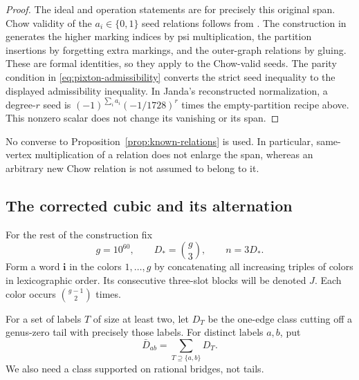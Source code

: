 \begin{proof}
The ideal and operation statements are
\cite[Proposition~1]{Pixton} for precisely this original span.
Chow validity of the \(a_i\in\{0,1\}\) seed relations follows from
\cite[Theorem~1 and its reconstruction]{Janda}.
The construction in \cite[Section~3.5]{PPZ} generates the higher
marking indices by psi multiplication, the partition insertions by
forgetting extra markings, and the outer-graph relations by gluing.
These are formal identities, so they apply to the Chow-valid seeds.
The parity condition in \eqref{eq:pixton-admissibility} converts the
strict seed inequality to the displayed admissibility inequality.
In Janda's reconstructed normalization, a degree-\(r\) seed is
\((-1)^{\sum_i a_i}(-1/1728)^r\) times the empty-partition recipe
above. This nonzero scalar does not change its vanishing or its span.
\end{proof}

No converse to Proposition~\ref{prop:known-relations} is used.
In particular, same-vertex multiplication of a relation does not enlarge
the span, whereas an arbitrary new Chow relation is not assumed to
belong to it.

\subsection{The corrected cubic and its alternation}

For the rest of the construction fix
\begin{equation}\label{eq:global-parameters}
g=10^{60},\qquad D_*=\binom g3,\qquad n=3D_*.
\end{equation}
Form a word \(\mathbf i\) in the colors \(1,\ldots,g\) by concatenating
all increasing triples of colors in lexicographic order. Its consecutive
three-slot blocks will be denoted \(J\). Each color occurs
\(\binom{g-1}{2}\) times.

For a set of labels \(T\) of size at least two, let \(D_T\) be the
one-edge class cutting off a genus-zero tail with precisely those
labels. For distinct labels \(a,b\), put
\[
\bar D_{ab}=\sum_{T\supseteq\{a,b\}}D_T.
\]
We also need a class supported on rational bridges, not tails.

